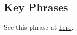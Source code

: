 		
\subsection{Key Phrases} %
	\label{FIRSTBORN-PHRASES}

	\begin{compactdesc}
		\item[church of the firstborn] See this phrase at \hyperref[CHURCH-PHRASES]{here}.
	\end{compactdesc}
	


	
		
	

